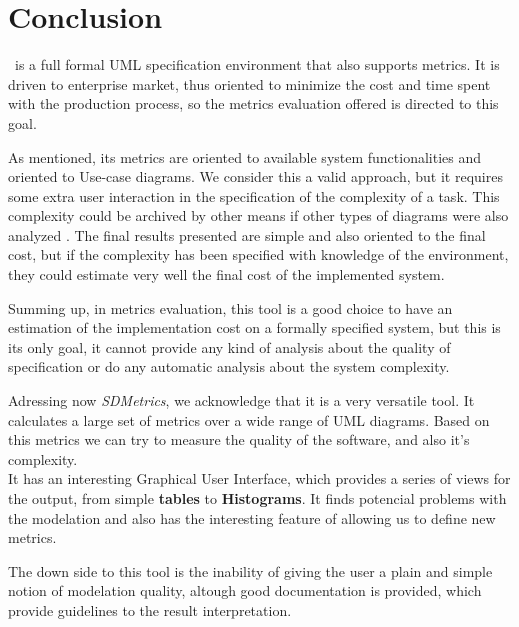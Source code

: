 \section{Conclusion} \label{conc}
\entArch\ is a full formal UML specification environment that also supports metrics. 
It is driven to enterprise market, thus oriented to minimize the cost and time spent with the production process, so the metrics evaluation offered is directed to this goal.

As mentioned, its metrics are oriented to available system functionalities and oriented to Use-case diagrams. 
We consider this a valid approach, but it requires some extra user interaction in the specification of the complexity of a task.
This complexity could be archived by other means if other types of diagrams were also analyzed .
The final results presented are simple and also oriented to the final cost, but if the complexity has been specified with knowledge of the environment, they could estimate very well the final cost of the implemented system.

Summing up, in metrics evaluation, this tool is a good choice to have an estimation of the implementation cost on a formally specified system, but this is its only goal, it cannot provide any kind of analysis about the quality of specification or do any automatic analysis about the system complexity.

Adressing now \textit{SDMetrics}, we acknowledge that it is a very versatile tool. It calculates a large set of metrics over a wide range of UML diagrams. Based on this metrics we can try to measure the quality of the software, and also it's complexity.\\
It has an interesting Graphical User Interface, which provides a series of views for the output, from simple \textbf{tables} to \textbf{Histograms}. It finds potencial problems with the modelation and also has the interesting feature of allowing us to define new metrics.

The down side to this tool is the inability of giving the user a plain and simple notion of modelation quality, altough good documentation is provided,  which provide guidelines to the result interpretation.
 

